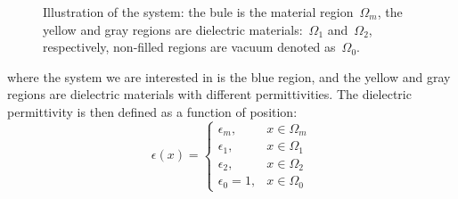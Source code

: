 \documentclass[prb,preprintnumbers,amsmath,amssymb, 10pt]{revtex4}
\begin{document}
\begin{figure}[htbp]
    \caption{Illustration of the system: the bule is the material region~$\Omega_m$, the yellow and gray regions are dielectric materials:~$\Omega_1$ and~$\Omega_2$, respectively, non-filled regions are vacuum denoted as~$\Omega_0$.}
    \label{fig:system}
\end{figure}
\noindent where the system we are interested in is the blue region, and the yellow and gray regions are dielectric materials with different permittivities.
The dielectric permittivity is then defined as a function of position:
\begin{equation}
    \epsilon(x) = \begin{cases}
        \epsilon_m, & x \in \Omega_m \\
        \epsilon_1, & x \in \Omega_1 \\
        \epsilon_2, & x \in \Omega_2 \\
        \epsilon_0 = 1, & x \in \Omega_0
    \end{cases}
\end{equation}
\end{document}
